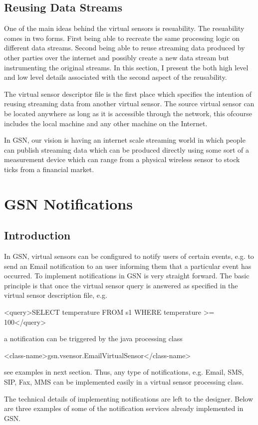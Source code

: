 \subsection{Reusing Data Streams}

One of the main ideas behind the virtual sensors is resuability. The resuability comes in two forms.
First being able to recreate the same processing logic on different data streams.
Second being able to reuse streaming data produced by other parties over the internet and possibly create a new data stream but instrumenting the original streams.
In this section, I present the both high level and low level details associated with the second aspect of the reusability.

The virtual sensor descriptor file is the first place which specifies the intention of reusing streaming data from another virtual sensor. The source virtual sensor can be located
anywhere as long as it is accessible through the network, this ofcourse includes the local machine and any other machine on the Internet. 


In GSN, our vision is having an internet scale streaming world in which people can publish streaming data which
can be produced directly using some sort of a measurement device which can range from a physical wireless sensor to stock ticks from a financial market.

\section{GSN Notifications}

\subsection{Introduction}

In GSN, virtual sensors can be configured to notify users of certain events, e.g. to send an Email notification to an user informing them that a particular event has occurred. To implement notifications in GSN is very straight forward. The basic principle is that once the virtual sensor query is answered as specified in the virtual sensor description file, e.g.

\begin{xmlcode}
<query>SELECT temperature FROM s1 WHERE temperature >= 100</query>
\end{xmlcode}

a notification can be triggered  by the java processing class

\begin{xmlcode}
<class-name>gsn.vsensor.EmailVirtualSensor</class-name>
\end{xmlcode}

see examples in next section. Thus, any type of notifications, e.g. Email, SMS, SIP, Fax, MMS can be implemented easily in a virtual sensor processing class. 

The technical details of implementing notifications are left to the designer. Below are three examples of some of the notification services already implemented in GSN.






